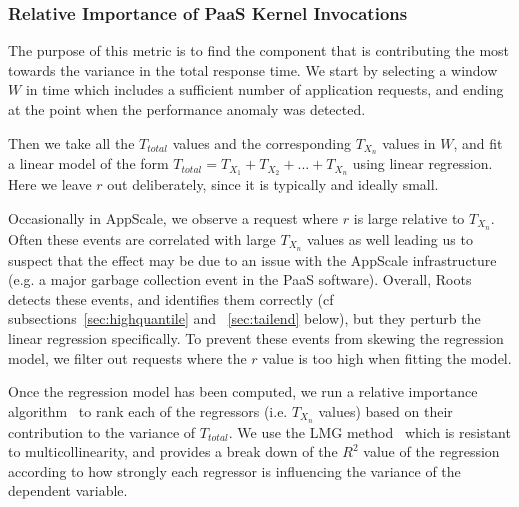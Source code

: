 
\subsubsection{Relative Importance of PaaS Kernel Invocations} 

The purpose of this metric is to find the component that is contributing 
the most towards the variance in the total response time. 
We start by selecting a window $W$ in time which includes a sufficient number of application requests,
and ending at the point when the performance anomaly was detected. 

Then we take all the $T_{total}$ values
and the corresponding $T_{X_n}$ values in $W$, and fit 
a linear model of the form 
$T_{total} = T_{X_1} + T_{X_2} + ... + T_{X_n}$
using linear regression. Here we leave $r$ out
deliberately, since it is typically and ideally small. 

Occasionally in AppScale, we observe a request where $r$ is
large relative to $T_{X_n}$.  Often these events are correlated with large
$T_{X_n}$ values as well leading us to suspect that the effect may be due to
an issue with the AppScale infrastructure (e.g. a major garbage collection
event in the PaaS software).  Overall, Roots detects these events, and identifies them correctly (cf
subsections~\ref{sec:highquantile} and ~\ref{sec:tailend} below), but they
perturb the linear regression specifically.
To prevent these events from skewing the regression model, 
we filter out requests where the $r$ value is too high when fitting the model. 

Once the regression model has been computed, we run a relative importance algorithm~\cite{JSSv017i01} to rank each of the
regressors (i.e. $T_{X_n}$ values) based on their contribution to the variance of $T_{total}$. 
We use the LMG method~\cite{lmg80} which is resistant to multicollinearity, and provides a break down of the $R^2$ value of
the regression according to how strongly each regressor is influencing the variance of the dependent variable.


